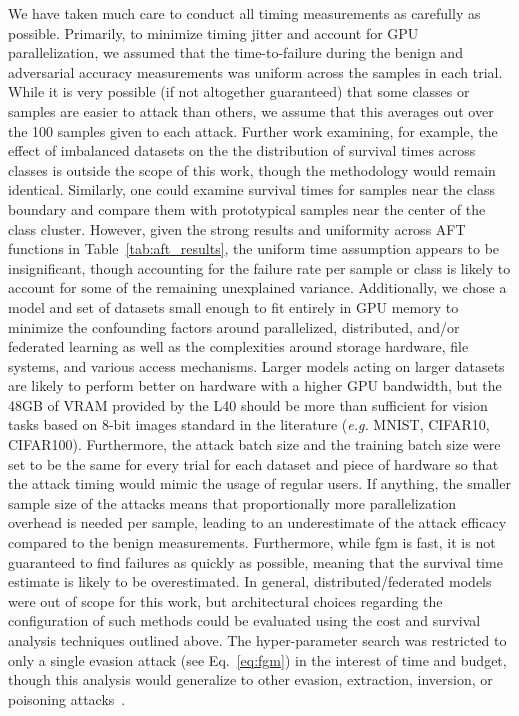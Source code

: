 \documentclass[sn-mathphys-num]{sn-jnl}%
\begin{document}
We have taken much care to conduct all timing measurements as carefully as possible.
Primarily, to minimize timing jitter and account for GPU parallelization, we assumed that the time-to-failure during the benign and adversarial accuracy measurements was uniform across the samples in each trial.
While it is very possible (if not altogether guaranteed) that some classes or samples are easier to attack than others, we assume that this averages out over the 100 samples given to each attack. Further work examining, for example, the effect of imbalanced datasets on the the distribution of survival times across classes is outside the scope of this work, though the methodology would remain identical. Similarly, one could examine survival times for samples near the class boundary and compare them with prototypical samples near the center of the class cluster.
However, given the strong results and uniformity across AFT functions in Table~\ref{tab:aft_results}, the uniform time assumption appears to be insignificant, though accounting for the failure rate per sample or class is likely to account for some of the remaining unexplained variance.
Additionally, we chose a model and set of datasets small enough to fit entirely in GPU memory to minimize the confounding factors around parallelized, distributed, and/or federated learning as well as the complexities around storage hardware, file systems, and various access mechanisms.
Larger models acting on larger datasets are likely to perform better on hardware with a higher GPU bandwidth, but the 48GB of VRAM provided by the L40 should be more than sufficient for vision tasks based on 8-bit images standard in the literature (\textit{e.g.} MNIST, CIFAR10, CIFAR100). Furthermore, the attack batch size and the training batch size were set to be the same for every trial for each dataset and piece of hardware so that the attack timing would mimic the usage of regular users.
If anything, the smaller sample size of the attacks means that proportionally more parallelization overhead is needed per sample, leading to an underestimate of the attack efficacy compared to the benign measurements. Furthermore, while \acrshort{fgm} is fast, it is not guaranteed to find failures as quickly as possible, meaning that the survival time estimate is likely to be overestimated.
In general, distributed/federated models were out of scope for this work, but architectural choices regarding the configuration of such methods could be evaluated using the cost and survival analysis techniques outlined above.
The hyper-parameter search was restricted to only a single evasion attack (see Eq.~\ref{eq:fgm}) in the interest of time and budget, though this analysis would generalize to other evasion, extraction, inversion, or poisoning attacks~\cite{biggio_evasion_2013,biggio_poisoning_2013,choquette2021label,orekondy2019knockoff}.
\end{document}
